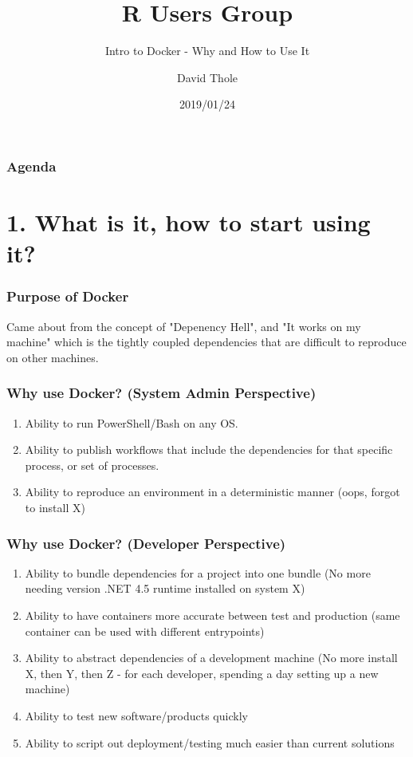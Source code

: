 \documentclass{beamer}
\title{R Users Group}
\subtitle{Intro to Docker - Why and How to Use It}
\author{David Thole}
\institute{University of Iowa, College of Pharmacy}
\date{2019/01/24}
\begin{document}
\frame{\titlepage}

\begin{frame}
    \frametitle{Agenda}
    \tableofcontents
\end{frame}

\section{1. What is it, how to start using it?}
\begin{frame}
    \frametitle{Purpose of Docker}
    Came about from the concept of "Depenency Hell", and "It works on my machine" which is the tightly coupled dependencies that are difficult to reproduce
    on other machines.
\end{frame}

\begin{frame}
    \frametitle{Why use Docker? (System Admin Perspective)}
    \begin{enumerate}
        \item Ability to run PowerShell/Bash on any OS.
        \item Ability to publish workflows that include the dependencies for that specific process, or set of processes.
        \item Ability to reproduce an environment in a deterministic manner (oops, forgot to install X)
    \end{enumerate}
\end{frame}

\begin{frame}
    \frametitle{Why use Docker? (Developer Perspective)}
    \begin{enumerate}
        \item Ability to bundle dependencies for a project into one bundle (No more needing version .NET 4.5 runtime installed on system X)
        \item Ability to have containers more accurate between test and production (same container can be used with different entrypoints)
        \item Ability to abstract dependencies of a development machine (No more install X, then Y, then Z - for each developer, spending a day setting up a new machine)
        \item Ability to test new software/products quickly
        \item Ability to script out deployment/testing much easier than current solutions
    \end{enumerate}
\end{frame}
\end{document}

